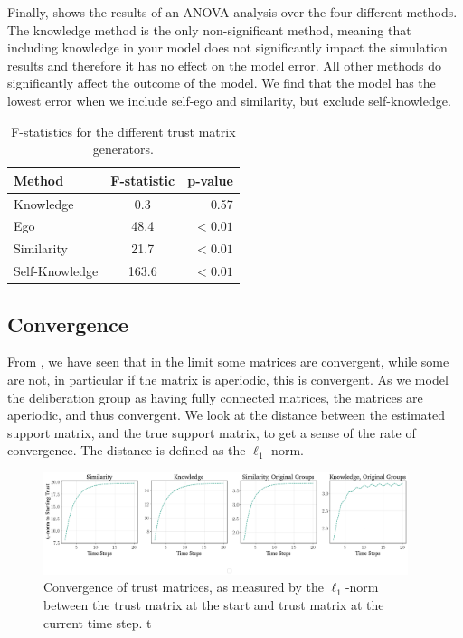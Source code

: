 Finally,  shows the results of an ANOVA analysis over the
four different methods. The knowledge method is the only non-significant
method, meaning that including knowledge in your model does not significantly
impact the simulation results and therefore it has no effect on the model
error. All other methods do significantly affect the outcome of the model. We
find that the model has the lowest error when we include self-ego and
similarity, but exclude self-knowledge.


\begin{table}
	\caption{F-statistics for the different trust matrix generators.}\label{tab:anova_trust}
	\begin{center}
		\begin{tabular}[c]{lcr}
			\toprule
			Method & F-statistic& p-value \\
			\hline
			Knowledge & 0.3 & 0.57 \\
			Ego & 48.4& $<0.01$ \\
			Similarity & 21.7& $< 0.01$ \\
			Self-Knowledge & 163.6& $ <0.01$ \\
			
			\bottomrule
		\end{tabular}
	\end{center}
\end{table}

\subsection{Convergence}

From , we have seen that in the limit some matrices are
convergent, while some are not, in particular if the matrix is aperiodic, this
is convergent. As we model the deliberation group as having fully connected
matrices, the matrices are aperiodic, and thus convergent. We look at the
distance between the estimated support matrix, and the true support matrix, to
get a sense of the rate of convergence. The distance is defined as the 
$\ell_1$ norm.

\begin{figure}[h]
	\begin{center}
		\includegraphics[width=0.95\textwidth]{Figures/convergence_groups.png}
	\end{center}
	\caption{Convergence of trust matrices, as measured by the $\ell_1$-norm between the trust matrix at the start and  trust matrix at the current time step.
		t}\label{fig:convergence_big}
\end{figure}




